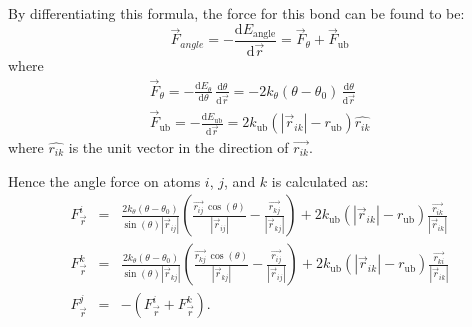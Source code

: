 \documentclass[11pt]{article}
\newcommand{\hatr}[1]{\mbox{$\hat{{r}_{#1}}$}}
\newcommand{\AbsVr}[1]{\mbox{$\left| \vec{r}_{#1} \right| $}}
\begin{document}
By differentiating this formula, the force for this bond can be found to be:
\begin{equation}
\vec{F}_{angle} = - \frac{\mathrm{d} E_{\mathrm{angle}}}{\mathrm{d} \vec{r}} \label{eq:angleForce}
                = \vec{F}_{\theta} + \vec{F}_{\mathrm{ub}}
\end{equation}
where
\begin{eqnarray*}
\vec{F}_{\theta} = - \frac{\mathrm{d} E_{\theta}}
	{\mathrm{d} \theta} \,\frac{\mathrm{d} \theta}{\mathrm{d} \vec{r} }
                = - 2k_{\theta}(\theta - \theta_0) \,\frac{\mathrm{d}
	 \theta}{\mathrm{d} \vec{r} }\\
\vec{F}_{\mathrm{ub}} = - \frac{\mathrm{d} E_{\mathrm{ub}}}
	{\mathrm{d} \vec{r}} = 2 k_{\mathrm{ub}} \left(
\AbsVr{ik} - r_{\mathrm{ub}} \right) \hatr{ik}
\end{eqnarray*}
where $\hatr{ik}$ is the unit vector in the direction of $\vec{r_{ik}}.$

Hence the angle force on atoms $i$, $j$, and $k$ is calculated as:
\begin{eqnarray}
\label{force_i}
   F_{\vec{r}}^i & = & 
             \frac{ 2k_{\theta}(\theta - \theta_0) }{
\sin(\theta) \AbsVr{ij} } 
             \left( \frac{ \vec{r_{ij}} \, \cos(\theta) }{ \AbsVr{ij}
} - \frac{\vec{r_{kj}}}{\AbsVr{kj} } \right) 
             + 2 k_{\mathrm{ub}} \left( \AbsVr{ik} - r_{\mathrm{ub}} \right)
\frac{\vec{r_{ik}}}{\AbsVr{ik}}\\
\label{force_k}
   F_{\vec{r}}^k & = & 
            \frac{ 2k_{\theta}(\theta - \theta_0) }{
\sin(\theta) \AbsVr{kj} } 
             \left( \frac{ \vec{r_{kj}} \, \cos(\theta) }{ \AbsVr{kj}
} - \frac{\vec{r_{ij}}}{\AbsVr{ij} } \right) 
             + 2 k_{\mathrm{ub}} \left( \AbsVr{ik} - r_{\mathrm{ub}} \right)
\frac{\vec{r_{ki}}}{\AbsVr{ik}} \\
\label{force_j}
   F_{\vec{r}}^j & = & - ( F_{\vec{r}}^i + F_{\vec{r}}^k ).
\end{eqnarray}
\end{document}
